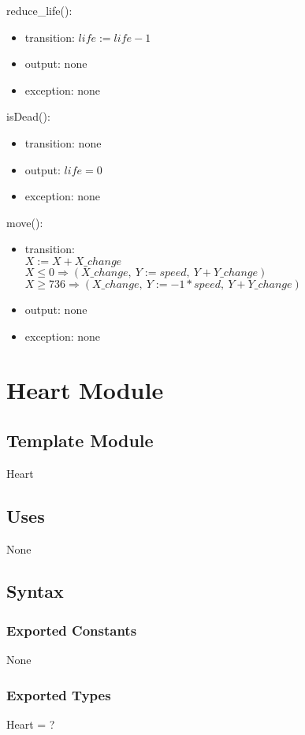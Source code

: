 \documentclass[12pt]{article}
\begin{document}
\noindent reduce\_life():
\begin{itemize}
\item transition: $life := life - 1$
\item output: none
\item exception: none
\end{itemize}

\noindent isDead():
\begin{itemize}
\item transition: none
\item output: $life = 0$
\item exception: none
\end{itemize}

\noindent move():
\begin{itemize}
\item transition: \\
$X := X + X\_change$\\
$X \leq 0 \Rightarrow (X\_change,\ Y  := speed,\ Y + Y\_change)$\\
$X \geq 736 \Rightarrow (X\_change,\ Y  := -1*speed,\ Y + Y\_change)$
\item output: none
\item exception: none
\end{itemize}
\newpage

\section{Heart Module}

\subsection*{Template Module}
Heart

\subsection*{Uses}
None

\subsection*{Syntax}
\subsubsection*{Exported Constants}
None
\subsubsection*{Exported Types}
Heart = ?
\end{document}
